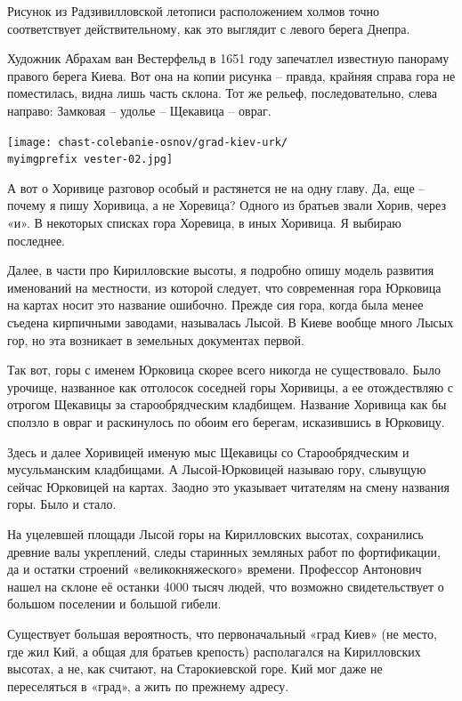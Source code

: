 Рисунок из Радзивилловской летописи расположением холмов точно соответствует действительному, как это выглядит с левого берега Днепра.

Художник Абрахам ван Вестерфельд в 1651 году запечатлел известную панораму правого берега Киева. Вот она на копии рисунка – правда, крайняя справа гора не поместилась, видна лишь часть склона. Тот же рельеф, последовательно, слева направо: Замковая – удолье – Щекавица – овраг.
 
\begin{center}
\texttt{[image: chast-colebanie-osnov/grad-kiev-urk/\\myimgprefix vester-02.jpg]}
\end{center} 

А вот о Хоривице разговор особый и растянется не на одну главу. Да, еще – почему я пишу Хоривица, а не Хоревица? Одного из братьев звали Хорив, через «и». В некоторых списках гора Хоревица, в иных Хоривица. Я выбираю последнее.

Далее, в части про Кирилловские высоты, я подробно опишу модель развития именований на местности, из которой следует, что современная гора Юрковица на картах носит это название ошибочно. Прежде сия гора, когда была менее съедена кирпичными заводами, называлась Лысой. В Киеве вообще много Лысых гор, но эта возникает в земельных документах первой.

Так вот, горы с именем Юрковица скорее всего никогда не существовало. Было урочище, названное как отголосок соседней горы Хоривицы, а ее отождествляю с отрогом Щекавицы за старообрядческим кладбищем. Название Хоривица как бы сползло в овраг и раскинулось по обоим его берегам, исказившись в Юрковицу.

Здесь и далее Хоривицей именую мыс Щекавицы со Старообрядческим и мусульманским кладбищами. А Лысой-Юрковицей называю гору, слывущую сейчас Юрковицей на картах. Заодно это указывает читателям на смену названия горы. Было и стало.

На уцелевшей площади Лысой горы на Кирилловских высотах, сохранились древние валы укреплений, следы старинных земляных работ по фортификации, да и остатки строений «великокняжеского» времени. Профессор Антонович нашел на склоне её останки 4000 тысяч людей, что возможно свидетельствует о большом поселении и большой гибели.

Существует большая вероятность, что первоначальный «град Киев» (не место, где жил Кий, а общая для братьев крепость) располагался на Кирилловских высотах, а не, как считают, на Старокиевской горе. Кий мог даже не переселяться в «град», а жить по прежнему адресу.

